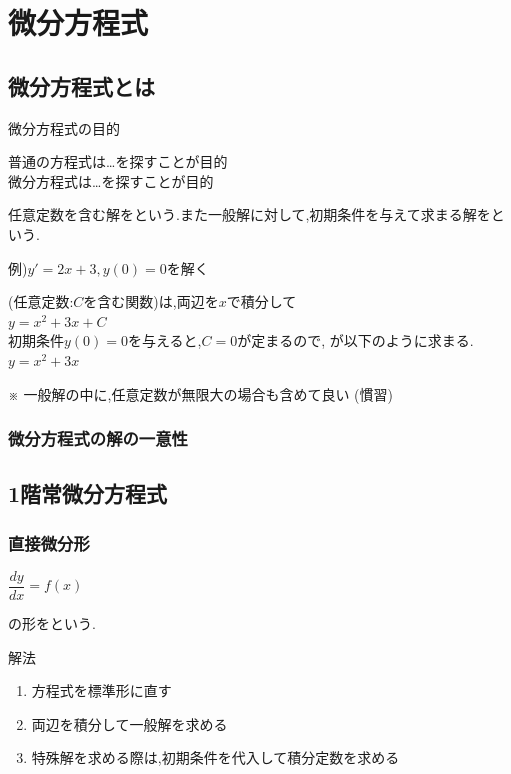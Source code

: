 \documentclass[a4paper]{jsarticle}
\begin{document}
\section{微分方程式}
\subsection{微分方程式とは}
\begin{itembox}[l]{微分方程式の目的}
    \begin{center}
        普通の方程式は\dots\qquad{}を探すことが目的\\
        微分方程式は\dots\qquad{}を探すことが目的
    \end{center}
\end{itembox}
任意定数を含む解をという.また一般解に対して,初期条件を与えて求まる解をという.
\begin{itembox}[l]{例)\quad$y'=2x+3,y\left(0\right)=0$を解く}
    \begin{center}
        (任意定数:$C$を含む関数)は,両辺を$x$で積分して\\
        $y=x^2+3x+C$\\
        初期条件$y\left(0\right)=0$を与えると,$C=0$が定まるので,
        が以下のように求まる.\\
        $y=x^2+3x$
    \end{center}
\end{itembox}
※ 一般解の中に,任意定数が無限大の場合も含めて良い (慣習)
\subsubsection{微分方程式の解の一意性}
\subsection{1階常微分方程式}
\subsubsection{直接微分形}
\begin{center}
    $\dfrac{dy}{dx}=f\left(x\right)$
\end{center}
の形をという.
\begin{itembox}[l]{解法}
    \begin{enumerate}[(1)]
        \item 方程式を標準形に直す
        \item 両辺を積分して一般解を求める
        \item 特殊解を求める際は,初期条件を代入して積分定数を求める
    \end{enumerate}
\end{itembox}
\end{document}

